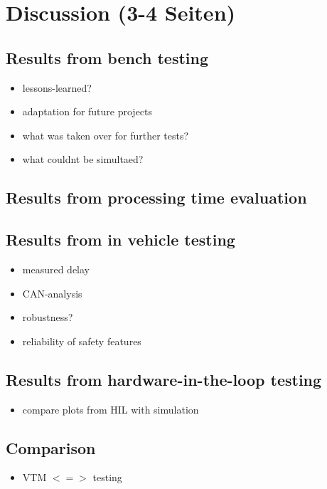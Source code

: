 \documentclass[ExampleMasters.tex]{subfiles}
\begin{document}
\clearpage
\chapter{Discussion (3-4 Seiten)}
\label{chap:discussion}

\section{Results from bench testing}
\label{sec:results_bench}

\begin{itemize}
	\item lessons-learned?
	\item adaptation for future projects
	\item what was taken over for further tests? 
	\item what couldnt be simultaed?
\end{itemize}

\section{Results from processing time evaluation}
\label{sec:results_processing_time}


\section{Results from in vehicle testing}
\label{sec:results_vehicle_testing}

\begin{itemize}
	\item measured delay
	\item CAN-analysis
	\item robustness?
	\item reliability of safety features
\end{itemize}
\section{Results from hardware-in-the-loop testing}
\begin{itemize}
	\item compare plots from HIL with simulation
\end{itemize}

\section{Comparison}
\label{sec:results_comparrison}
\begin{itemize}
	\item VTM $<=>$ testing
\end{itemize}
\end{document}
